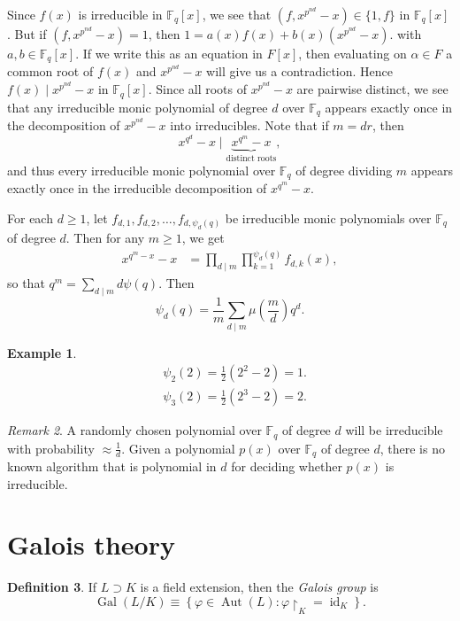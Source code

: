 \documentclass[10pt,letterpaper,cm]{nupset}
\theoremstyle{definition}
\newtheorem{definition}{Definition}[subsection]
\newtheorem{exmp}[definition]{Example}
\theoremstyle{theorem}
\theoremstyle{remark}
\newtheorem{remark}[definition]{Remark}
\newcommand{\F}{\mathbb F}
\newcommand{\1}{\mathbf{1}}
\newcommand{\0}{\vec 0}
\DeclareMathOperator{\id}{id}
\DeclareMathOperator{\gal}{Gal}
\DeclareMathOperator{\aut}{Aut}
\begin{document}
Since $f(x)$ is irreducible in $\F_q[x]$, we see that $\left(f, x^{p^{nd}}-x\right) \in \{1,f\}$ in $\F_q[x]$. But if $(f, x^{p^{nd}}-x)=1$, then $1 = a(x)f(x) + b(x)(x^{p^{nd}}-x)$.  with $a, b\in \F_q[x]$. If we write this as an equation in $F[x]$, then evaluating on $\alpha \in F$ a common root of $f(x)$ and $x^{p^{nd}}-x$ will give us a contradiction. Hence $f(x) \mid x^{p^{nd}}-x$ in $\F_q[x]$. Since all roots of $x^{p^{nd}}-x$ are pairwise distinct, we see that any irreducible monic polynomial of degree $d$ over $\F_q$ appears exactly once in the decomposition of $x^{p^{nd}}-x$ into irreducibles. Note that if $m =dr$, then $$x^{q^d}-x \mid \underbrace{x^{q^m} -x}_{\text{distinct roots}},$$ and thus every irreducible monic polynomial over $\F_q$ of degree dividing $m$ appears exactly once in the irreducible decomposition of $x^{q^m}-x$. 

For each $d\geq 1$, let $f_{d,1}, f_{d,2}, \ldots, f_{d, \psi_d(q)}$ be irreducible monic polynomials over $\F_q$ of degree $d$. Then for any $m\geq 1$, we get
\begin{align*}
x^{q^m -x}-x & = \prod_{d\mid m} \prod_{k=1}^{\psi_d(q)}f_{d,k}(x),
\end{align*}
so that $q^m = \sum_{d\mid m} d\psi(q)$. Then $$ \psi_d(q) = \frac{1}{m}\sum_{d\mid m}\mu\left(\frac{m}{d}\right)q^d  .$$ 


\begin{exmp}
\begin{align*}
& \psi_2(2) = \frac{1}{2}(2^2-2)=1.
\\ &  \psi_3(2) = \frac{1}{2}(2^3 -2) =2.
\end{align*}
\end{exmp}

\begin{remark}
A randomly chosen polynomial over $\F_q$ of degree $d$ will be irreducible with probability $\approx \frac{1}{d}$. Given a polynomial $p(x)$ over $\F_q$ of degree $d$, there is no known algorithm that is polynomial in $d$ for deciding whether $p(x)$  is irreducible. 
\end{remark}

\section{Galois theory}

\begin{definition}
If $L \supset K$ is a field extension, then the \textit{Galois group} is $$\gal(L/K) \equiv \left\{\varphi \in \aut(L) : \varphi\restriction_K = \id_K\right\}.    $$
\end{definition}
\end{document}
